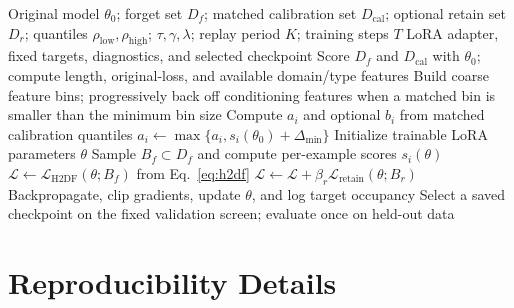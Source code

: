 \documentclass[10pt,twocolumn]{article}
\newcommand{\Lcal}{\mathcal{L}}
\begin{document}
\begin{algorithm}[H]
\caption{Calibrated target-band unlearning. Calibration is completed before
optimization; targets are not re-estimated from evaluation data.}
\label{alg:h2df}
\begin{algorithmic}[1]
\Require Original model $\theta_0$; forget set $D_f$; matched calibration set
$D_{\mathrm{cal}}$; optional retain set $D_r$; quantiles
$\rho_{\mathrm{low}},\rho_{\mathrm{high}}$; $\tau,\gamma,\lambda$; replay
period $K$; training steps $T$
\Ensure LoRA adapter, fixed targets, diagnostics, and selected checkpoint
\State Score $D_f$ and $D_{\mathrm{cal}}$ with $\theta_0$; compute length,
original-loss, and available domain/type features
\State Build coarse feature bins; progressively back off conditioning features
when a matched bin is smaller than the minimum bin size
  \State Compute $a_i$ and optional $b_i$ from matched calibration quantiles
    \State $a_i\gets\max\{a_i,s_i(\theta_0)+\Delta_{\min}\}$
  \EndIf
\EndFor
\State Initialize trainable LoRA parameters $\theta$
  \State Sample $B_f\subset D_f$ and compute per-example scores $s_i(\theta)$
  \State $\Lcal\gets\Lcal_{\mathrm{H2DF}}(\theta;B_f)$ from
  Eq.~\eqref{eq:h2df}
    \State $\Lcal\gets\Lcal+\beta_r\Lcal_{\mathrm{retain}}(\theta;B_r)$
  \EndIf
  \State Backpropagate, clip gradients, update $\theta$, and log target occupancy
\EndFor
\State Select a saved checkpoint on the fixed validation screen; evaluate once
on held-out data
\end{algorithmic}
\end{algorithm}

\section{Reproducibility Details}
\label{app:reproducibility}
\end{document}

